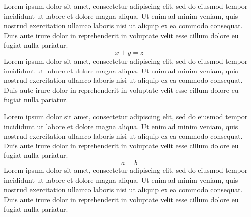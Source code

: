  \hsize=4in \vsize=1.15in 
Lorem ipsum dolor sit amet, consectetur adipiscing elit, sed do eiusmod tempor incididunt
ut labore et dolore magna aliqua. Ut enim ad minim veniam, quis nostrud exercitation
ullamco laboris nisi ut aliquip ex ea commodo consequat. Duis aute irure dolor in
reprehenderit in voluptate velit esse cillum dolore eu fugiat nulla pariatur.
$$x+y=z$$
Lorem ipsum dolor sit amet, consectetur adipiscing elit, sed do eiusmod tempor incididunt
ut labore et dolore magna aliqua. Ut enim ad minim veniam, quis nostrud exercitation
ullamco laboris nisi ut aliquip ex ea commodo consequat. Duis aute irure dolor in
reprehenderit in voluptate velit esse cillum dolore eu fugiat nulla pariatur.
\par
Lorem ipsum dolor sit amet, consectetur adipiscing elit, sed do eiusmod tempor incididunt
ut labore et dolore magna aliqua. Ut enim ad minim veniam, quis nostrud exercitation
ullamco laboris nisi ut aliquip ex ea commodo consequat. Duis aute irure dolor in
reprehenderit in voluptate velit esse cillum dolore eu fugiat nulla pariatur.
$$a=b$$
Lorem ipsum dolor sit amet, consectetur adipiscing elit, sed do eiusmod tempor incididunt
ut labore et dolore magna aliqua. Ut enim ad minim veniam, quis nostrud exercitation
ullamco laboris nisi ut aliquip ex ea commodo consequat. Duis aute irure dolor in
reprehenderit in voluptate velit esse cillum dolore eu fugiat nulla pariatur.
\bye
